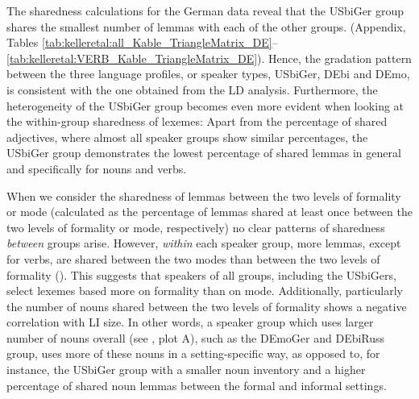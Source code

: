\documentclass[output=paper,colorlinks,citecolor=brown]{langscibook}
\begin{document}
The sharedness calculations for the German data reveal that the USbiGer group shares the smallest number of lemmas with each of the other groups. (Appendix, Tables \ref{tab:kelleretal:all_Kable_TriangleMatrix_DE}--\ref{tab:kelleretal:VERB_Kable_TriangleMatrix_DE}). Hence, the gradation pattern between the three language profiles, or speaker types, USbiGer, DEbi and DEmo, is consistent with the one obtained from the LD analysis. Furthermore, the heterogeneity of the USbiGer group becomes even more evident when looking at the within-group sharedness of lexemes: Apart from the percentage of shared adjectives, where almost all speaker groups show similar percentages, the USbiGer group demonstrates the lowest percentage of shared lemmas in general and specifically for nouns and verbs. 

When we consider the sharedness of lemmas between the two levels of formality or mode (calculated as the percentage of lemmas shared at least once between the two levels of formality or mode, respectively) no clear patterns of sharedness \textit{between} groups arise. However, \textit{within} each speaker group, more lemmas, except for verbs, are shared between the two modes than between the two levels of formality (). This suggests that speakers of all groups, including the USbiGers, select lexemes based more on formality than on mode. Additionally, particularly the number of nouns shared between the two levels of formality shows a negative correlation with LI size. In other words, a speaker group which uses larger number of nouns overall (see , plot A), such as the DEmoGer and DEbiRuss group, uses more of these nouns in a setting-specific way, as opposed to, for instance, the USbiGer group with a smaller noun inventory and a higher percentage of shared noun lemmas between the formal and informal settings.
\end{document}
